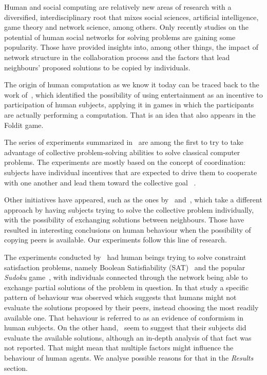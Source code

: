 \documentclass{article}
\begin{document}
Human and social computing are relatively new areas of research with a diversified, interdisciplinary root that mixes social sciences, artificial intelligence, game theory and network science, among others. %
Only recently studies on the potential of human social networks for solving problems are gaining some popularity. %
Those have provided insights into, among other things, the impact of network structure in the collaboration process and the factors that lead neighbours' proposed solutions to be copied by individuals.

The origin of human computation as we know it today can be traced back to the work of~\cite{vonahm:gwap}, which identified the possibility of using entertainment as an incentive to participation of human subjects, applying it in games in which the participants are actually performing a computation. That is an idea that also appears in the Foldit game. %

The series of experiments summarized in~\cite{kearns:experim} are among the first to try to take advantage of collective problem-solving abilities to solve classical computer problems. The experiments are mostly based on the concept of coordination: subjects have individual incentives that are expected to drive them to cooperate with one another and lead them toward the collective goal ~\cite{nowak:evolutioncooperation}.

Other initiatives have appeared, such as the ones by~\cite{farenzena:collabem} and~\cite{mason:collablearnet}, which take a different approach by having subjects trying to solve the collective problem individually, with the possibility of exchanging solutions between neighbours. Those have resulted in interesting conclusions on human behaviour when the possibility of copying peers is available. Our experiments follow this line of research.

The experiments conducted by~\cite{farenzena:collabem} had human beings trying to solve constraint satisfaction problems, namely Boolean Satisfiability (SAT)~\cite{cook:complexitytheoremproving} and the popular \emph{Sudoku} game~\cite{weber:satsudoku}, with individuals connected through the network being able to exchange partial solutions of the problem in question.
In that study a specific pattern of behaviour was observed which suggests that humans might not evaluate the solutions proposed by their peers, instead choosing the most readily available one.
That behaviour is referred to as an evidence of conformism in human subjects. On the other hand,~\cite{mason:collablearnet} seem to suggest that their subjects did evaluate the available solutions, although %
an in-depth analysis of that fact was not reported. That might mean that multiple factors might influence the behaviour of human agents. We analyse possible reasons for that in the \emph{Results} section. %
\end{document}
